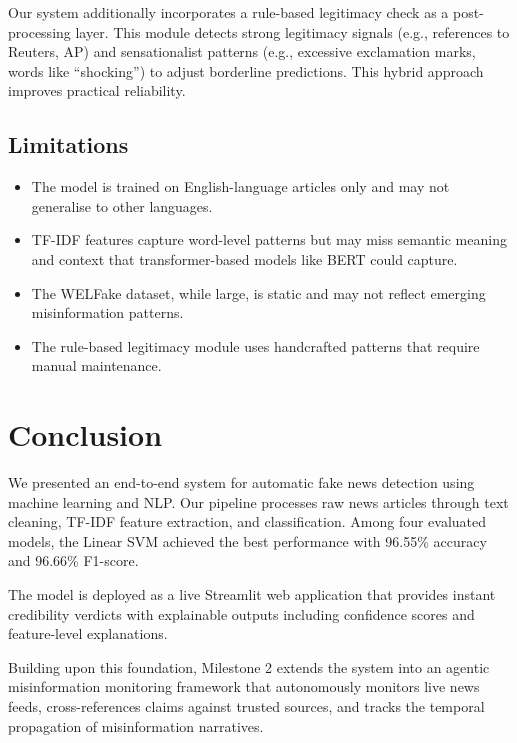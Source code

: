 \documentclass[conference]{IEEEtran}
\begin{document}
Our system additionally incorporates a rule-based legitimacy check as a post-processing layer. This module detects strong legitimacy signals (e.g., references to Reuters, AP) and sensationalist patterns (e.g., excessive exclamation marks, words like ``shocking'') to adjust borderline predictions. This hybrid approach improves practical reliability.

\subsection{Limitations}

\begin{itemize}
    \item The model is trained on English-language articles only and may not generalise to other languages.
    \item TF-IDF features capture word-level patterns but may miss semantic meaning and context that transformer-based models like BERT could capture.
    \item The WELFake dataset, while large, is static and may not reflect emerging misinformation patterns.
    \item The rule-based legitimacy module uses handcrafted patterns that require manual maintenance.
\end{itemize}

\section{Conclusion}

We presented an end-to-end system for automatic fake news detection using machine learning and NLP. Our pipeline processes raw news articles through text cleaning, TF-IDF feature extraction, and classification. Among four evaluated models, the Linear SVM achieved the best performance with 96.55\% accuracy and 96.66\% F1-score.

The model is deployed as a live Streamlit web application that provides instant credibility verdicts with explainable outputs including confidence scores and feature-level explanations.

Building upon this foundation, Milestone 2 extends the system into an agentic misinformation monitoring framework that autonomously monitors live news feeds, cross-references claims against trusted sources, and tracks the temporal propagation of misinformation narratives.

\end{document}
